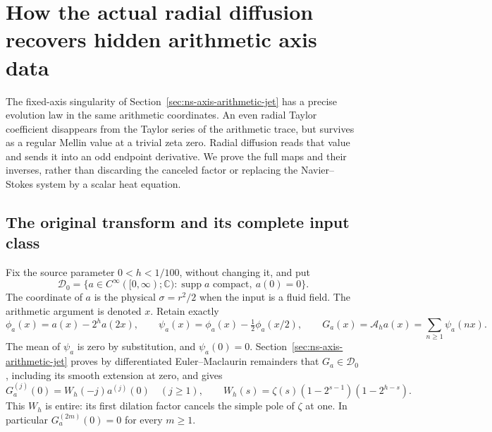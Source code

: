 \section{How the actual radial diffusion recovers hidden arithmetic axis data}
\label{sec:ns-hidden-mellin-diffusion}

The fixed-axis singularity of Section~\ref{sec:ns-axis-arithmetic-jet}
has a precise evolution law in the same arithmetic coordinates.
An even radial Taylor coefficient disappears from the Taylor series
of the arithmetic trace, but survives as a regular Mellin value at
a trivial zeta zero. Radial diffusion reads that value and sends it
into an odd endpoint derivative. We prove the full maps and their
inverses, rather than discarding the canceled factor or replacing the
Navier--Stokes system by a scalar heat equation.

\subsection{The original transform and its complete input class}

Fix the source parameter \(0<h<1/100\), without changing it, and put
\[
 \mathcal D_0=\{a\in C^\infty([0,\infty);\mathbb C):
                   \operatorname{supp}a\text{ compact},\ a(0)=0\}.
\]
The coordinate of \(a\) is the physical \(\sigma=r^2/2\) when the
input is a fluid field. The arithmetic argument is denoted \(x\).
Retain exactly
\[
 \phi_a(x)=a(x)-2^ha(2x),\qquad
 \psi_a(x)=\phi_a(x)-\tfrac12\phi_a(x/2),\qquad
 G_a(x)=\mathcal A_ha(x)=\sum_{n\ge1}\psi_a(nx).
\]
The mean of \(\psi_a\) is zero by substitution, and \(\psi_a(0)=0\).
Section~\ref{sec:ns-axis-arithmetic-jet} proves by differentiated
Euler--Maclaurin remainders that \(G_a\in\mathcal D_0\), including
its smooth extension at zero, and gives
\begin{equation}\label{ndm:jet}
 G_a^{(j)}(0)=W_h(-j)a^{(j)}(0)\quad(j\ge1),\qquad
 W_h(s)=\zeta(s)(1-2^{s-1})(1-2^{h-s}).
\end{equation}
This \(W_h\) is entire: its first dilation factor cancels the
simple pole of \(\zeta\) at one. In particular \(G_a^{(2m)}(0)=0\)
for every \(m\ge1\).


